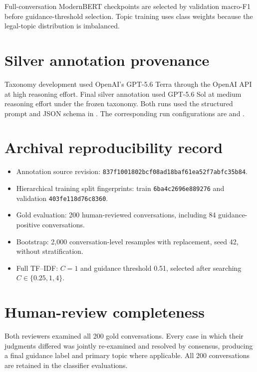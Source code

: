 \documentclass[11pt]{article}
\begin{document}
Full-conversation ModernBERT checkpoints are selected by validation macro-F1 before guidance-threshold selection. Topic training uses class weights because the legal-topic distribution is imbalanced.

\section{Silver annotation provenance}

Taxonomy development used OpenAI's GPT-5.6 Terra through the OpenAI API at high reasoning effort. Final silver annotation used GPT-5.6 Sol at medium reasoning effort under the frozen taxonomy. Both runs used the structured prompt and JSON schema in . The corresponding run configurations are  and .

\section{Archival reproducibility record}

\begin{itemize}
  \item Annotation source revision: \texttt{837f1001802bcf08ad18\hspace{0pt}baf61ea52f7abfc35b84}.
  \item Hierarchical training split fingerprints: train \texttt{6ba4c269\hspace{0pt}6e889276} and validation \texttt{403fe118\hspace{0pt}d76c8360}.
  \item Gold evaluation: 200 human-reviewed conversations, including 84 guidance-positive conversations.
  \item Bootstrap: 2,000 conversation-level resamples with replacement, seed 42, without stratification.
  \item Full TF--IDF: $C=1$ and guidance threshold 0.51, selected after searching $C\in\{0.25,1,4\}$.
\end{itemize}

\section{Human-review completeness}

Both reviewers examined all 200 gold conversations. Every case in which their judgments differed was jointly re-examined and resolved by consensus, producing a final guidance label and primary topic where applicable. All 200 conversations are retained in the classifier evaluations.
\end{document}
